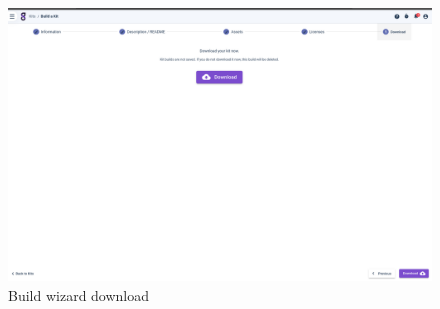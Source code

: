 \begin{figure}[H]
	\includegraphics[width=0.8\linewidth]{images/buildwizard5.png}
	\caption{Build wizard download}
	\label{fig:buildwizard5}
\end{figure}
